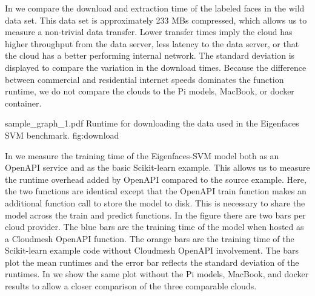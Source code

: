 In  we compare the download and extraction time of the labeled faces in the wild data set. This data set is approximately 233 MBs
compressed, which allows us to measure a non-trivial data transfer.
Lower transfer times imply the cloud has higher throughput from the data
server, less latency to the data server, or that the cloud has a better performing internal network. The standard deviation is displayed to compare the variation in the download times. Because the difference between commercial and residential internet speeds dominates the function runtime, we do not compare the clouds to the Pi models, MacBook, or docker container.

\OneFIGURE
    {sample_graph_1.pdf}
    {Runtime for downloading the data used in the Eigenfaces SVM benchmark.}
    {fig:download}
    
In  we measure the training time of the Eigenfaces-SVM model both as an OpenAPI service and as the basic Scikit-learn example. This
allows us to measure the runtime overhead added by OpenAPI compared to the
source example. Here, the two functions are identical except that the
OpenAPI train function makes an additional function call to store the
model to disk. This is necessary to share the model across
the train and predict functions. In the figure there are two bars per cloud provider. The blue bars are the training time of the model when hosted as a Cloudmesh OpenAPI function. The
orange bars are the training time of the Scikit-learn example code without Cloudmesh OpenAPI involvement. The bars plot the mean runtimes and the error bar reflects the standard deviation of the runtimes. In   we show the same plot without the Pi models, MacBook, and docker results to allow a closer comparison of the three comparable clouds.

